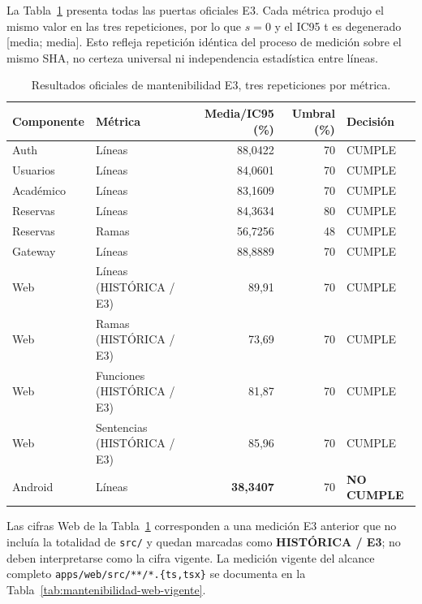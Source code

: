 La Tabla~\ref{tab:mantenibilidad-e3} presenta todas las puertas oficiales E3.
Cada métrica produjo el mismo valor en las tres repeticiones, por lo que
$s=0$ y el IC95 t es degenerado [media; media]. Esto refleja repetición idéntica
del proceso de medición sobre el mismo SHA, no certeza universal ni independencia
estadística entre líneas.

\begin{table}[ht]
  \centering
  \small
  \caption{Resultados oficiales de mantenibilidad E3, tres repeticiones por métrica.}
  \label{tab:mantenibilidad-e3}
  \begin{tabular}{|l|l|r|r|l|}
    \hline
    \textbf{Componente} & \textbf{Métrica} & \textbf{Media/IC95 (\%)} & \textbf{Umbral (\%)} & \textbf{Decisión} \\
    \hline
    Auth & Líneas & 88,0422 & 70 & CUMPLE \\
    Usuarios & Líneas & 84,0601 & 70 & CUMPLE \\
    Académico & Líneas & 83,1609 & 70 & CUMPLE \\
    Reservas & Líneas & 84,3634 & 80 & CUMPLE \\
    Reservas & Ramas & 56,7256 & 48 & CUMPLE \\
    Gateway & Líneas & 88,8889 & 70 & CUMPLE \\
    Web & Líneas (HISTÓRICA / E3) & 89,91 & 70 & CUMPLE \\
    Web & Ramas (HISTÓRICA / E3) & 73,69 & 70 & CUMPLE \\
    Web & Funciones (HISTÓRICA / E3) & 81,87 & 70 & CUMPLE \\
    Web & Sentencias (HISTÓRICA / E3) & 85,96 & 70 & CUMPLE \\
    Android & Líneas & \textbf{38,3407} & 70 & \textbf{NO CUMPLE} \\
    \hline
  \end{tabular}
\end{table}

Las cifras Web de la Tabla~\ref{tab:mantenibilidad-e3} corresponden a una
medición E3 anterior que no incluía la totalidad de \texttt{src/} y quedan
marcadas como \textbf{HISTÓRICA / E3}; no deben interpretarse como la cifra
vigente. La medición vigente del alcance completo \texttt{apps/web/src/**/*.\{ts,tsx\}}
se documenta en la Tabla~\ref{tab:mantenibilidad-web-vigente}.

